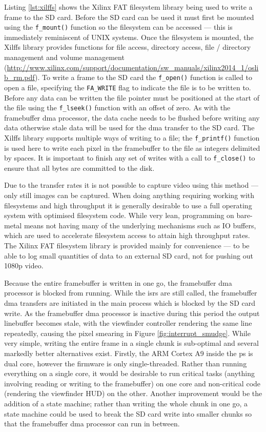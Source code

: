 Listing \ref{lst:xilffs} shows the Xilinx FAT filesystem library being used to write a frame to the SD card. Before the SD card can be used it must first be mounted using the \texttt{f\_mount()} function so the filesystem can be accessed --- this is immediately reminiscent of UNIX systems. Once the filesystem is mounted, the Xilffs library provides functions for file access, directory access, file / directory management and volume management (\url{http://www.xilinx.com/support/documentation/sw_manuals/xilinx2014_1/oslib_rm.pdf}). To write a frame to the SD card the \texttt{f\_open()} function is called to open a file, specifying the \texttt{FA\_WRITE} flag to indicate the file is to be written to. Before any data can be written the file pointer must be positioned at the start of the file using the \texttt{f\_lseek()} function with an offset of zero. As with the framebuffer \gls{dma} processor, the data cache needs to be flushed before writing any data otherwise stale data will be used for the \gls{dma} transfer to the SD card. The Xilffs library supports multiple ways of writing to a file; the \texttt{f\_printf()} function is used here to write each pixel in the framebuffer to the file as integers delimited by spaces. It is important to finish any set of writes with a call to \texttt{f\_close()} to ensure that all bytes are committed to the disk.

Due to the transfer rates it is not possible to capture video using this method --- only still images can be captured. When doing anything requiring working with filesystems and high throughput it is generally desirable to use a full operating system with optimised filesystem code. While very lean, programming on bare-metal means not having many of the underlying mechanisms such as IO buffers, which are used to accelerate filesystem access to attain high throughput rates. The Xilinx FAT filesystem library is provided mainly for convenience --- to be able to log small quantities of data to an external SD card, not for pushing out 1080p video.

Because the entire framebuffer is written in one go, the framebuffer \gls{dma} processor is blocked from running. While the \glspl{isr} are still called, the framebuffer \gls{dma} transfers are initiated in the main process which is blocked by the SD card write. As the framebuffer \gls{dma} processor is inactive during this period the output linebuffer becomes stale, with the viewfinder controller rendering the same line repeatedly, causing the pixel smearing in Figure \ref{fig:interrupt_smudge}. While very simple, writing the entire frame in a single chunk is sub-optimal and several markedly better alternatives exist. Firstly, the ARM Cortex A9 inside the \gls{ps} is dual core, however the firmware is only single-threaded. Rather than running everything on a single core, it would be desirable to run critical tasks  (anything involving reading or writing to the framebuffer) on one core and non-critical code (rendering the viewfinder HUD) on the other. Another improvement would be the addition of a state machine; rather than writing the whole chunk in one go, a state machine could be used to break the SD card write into smaller chunks so that the framebuffer \gls{dma} processor can run in between.

